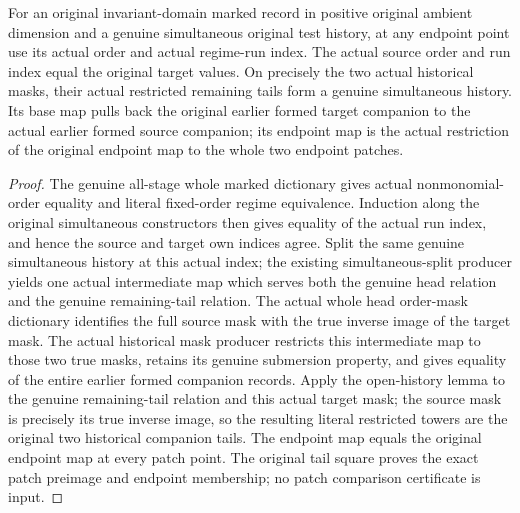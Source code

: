 \begin{lemma}
\label{hir:historical-control-historical-tail}
\leanok
For an original invariant-domain marked record in positive original ambient dimension and a genuine simultaneous original test history, at any endpoint point use its actual order and actual regime-run index. The actual source order and run index equal the original target values. On precisely the two actual historical masks, their actual restricted remaining tails form a genuine simultaneous history. Its base map pulls back the original earlier formed target companion to the actual earlier formed source companion; its endpoint map is the actual restriction of the original endpoint map to the whole two endpoint patches.
\end{lemma}
\begin{proof}
The genuine all-stage whole marked dictionary gives actual nonmonomial-order equality and literal fixed-order regime equivalence. Induction along the original simultaneous constructors then gives equality of the actual run index, and hence the source and target own indices agree. Split the same genuine simultaneous history at this actual index; the existing simultaneous-split producer yields one actual intermediate map which serves both the genuine head relation and the genuine remaining-tail relation. The actual whole head order-mask dictionary identifies the full source mask with the true inverse image of the target mask. The actual historical mask producer restricts this intermediate map to those two true masks, retains its genuine submersion property, and gives equality of the entire earlier formed companion records. Apply the open-history lemma to the genuine remaining-tail relation and this actual target mask; the source mask is precisely its true inverse image, so the resulting literal restricted towers are the original two historical companion tails. The endpoint map equals the original endpoint map at every patch point. The original tail square proves the exact patch preimage and endpoint membership; no patch comparison certificate is input.
\end{proof}

